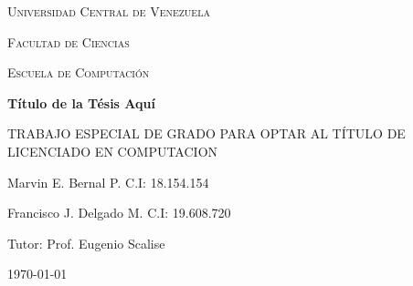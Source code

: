 \begin{titlepage}
	\centering
	{\scshape\LARGE Universidad Central de Venezuela\par}
	{\scshape\LARGE Facultad de Ciencias\par}
	{\scshape\LARGE Escuela de Computación\par}


	\vspace*{\fill}
	{\huge\bfseries Título de la Tésis Aquí\par}
	\vspace{2cm}
	{\large TRABAJO ESPECIAL DE GRADO PARA OPTAR AL TÍTULO DE LICENCIADO EN COMPUTACION\par}
	\vspace*{\fill}
	
	{\large Marvin E. Bernal P. C.I: 18.154.154\par}
	{\large Francisco J. Delgado M. C.I: 19.608.720\par}
	{\large Tutor: Prof. Eugenio Scalise\par}
	\vspace{1cm}
	{\large \today\par}
\end{titlepage}